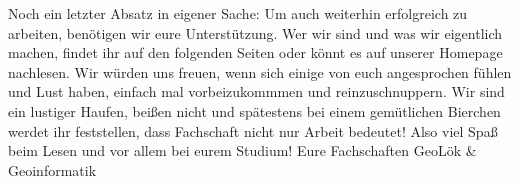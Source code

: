Noch ein letzter Absatz in eigener Sache: Um auch weiterhin erfolgreich zu arbeiten, benötigen wir eure Unterstützung. Wer wir sind und was wir eigentlich machen, findet ihr auf den folgenden Seiten oder könnt es auf unserer Homepage nachlesen. Wir würden uns freuen, wenn sich einige von euch angesprochen fühlen und Lust haben, einfach mal vorbeizukommmen und reinzuschnuppern. Wir sind ein lustiger Haufen, beißen nicht und spätestens bei einem gemütlichen Bierchen werdet ihr feststellen, dass Fachschaft nicht nur Arbeit bedeutet! Also viel Spaß beim Lesen und vor allem bei eurem Studium!
\bigskip
\newline
Eure Fachschaften GeoLök \& Geoinformatik

